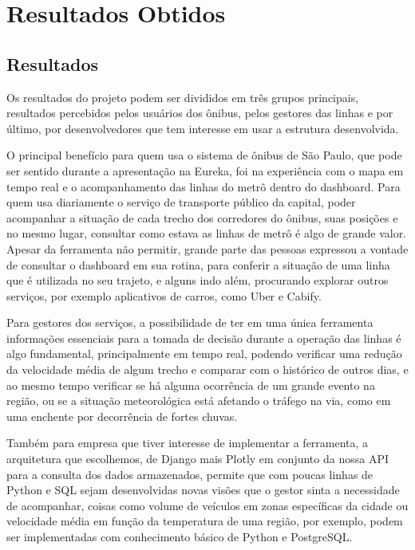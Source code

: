 \chapter{Resultados Obtidos}
\label{Cap:Resultados}
\newcommand{\EscalaAlgumaCoisa}{0.6}


\section{Resultados}
\indent
\par Os resultados do projeto podem ser divididos em três grupos principais, resultados percebidos pelos usuários dos ônibus, pelos gestores das linhas e por último, por desenvolvedores que tem interesse em usar a estrutura desenvolvida.
\indent
\par O principal benefício para quem usa o sistema de ônibus de São Paulo, que pode ser sentido durante a apresentação na Eureka, foi na experiência com o mapa em tempo real e o acompanhamento das linhas do metrô dentro do dashboard. Para quem usa diariamente o serviço de transporte público da capital, poder acompanhar a situação de cada trecho dos corredores do ônibus, suas posições e no mesmo lugar, consultar como estava as linhas de metrô é algo de grande valor. Apesar da ferramenta não permitir, grande parte das pessoas expressou a vontade de consultar o dashboard em sua rotina, para conferir a situação de uma linha que é utilizada no seu trajeto, e alguns indo além, procurando explorar outros serviços, por exemplo aplicativos de carros, como Uber e Cabify.
\indent
\par Para gestores dos serviços, a possibilidade de ter em uma única ferramenta informações essenciais para a tomada de decisão durante a operação das linhas é algo fundamental, principalmente em tempo real, podendo verificar uma redução da velocidade média de algum trecho e comparar com o histórico de outros dias, e ao mesmo tempo verificar se há alguma ocorrência de um grande evento na região, ou se a situação meteorológica está afetando o tráfego na via, como em uma enchente por decorrência de fortes chuvas.
\indent
\par Também para empresa que tiver interesse de implementar a ferramenta, a arquitetura que escolhemos, de Django mais Plotly em conjunto da nossa API para a consulta dos dados armazenados, permite que com poucas linhas de Python e SQL sejam desenvolvidas novas visões que o gestor sinta a necessidade de acompanhar, coisas como volume de veículos em zonas específicas da cidade ou velocidade média em função da temperatura de uma região, por exemplo, podem ser implementadas com conhecimento básico de Python e PostgreSQL.

